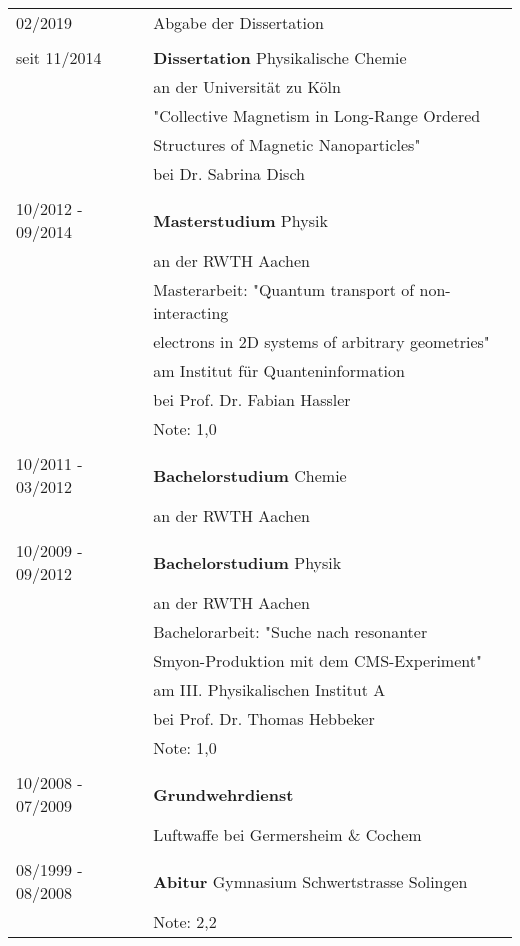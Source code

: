 \documentclass[\main/dresen_thesis.tex]{subfiles}
\begin{document}
	\begin{table}[H]
		\begin{tabular}{p{5cm}l}
			02/2019						& Abgabe der Dissertation\\ \\

			seit 11/2014 			& \textbf{Dissertation} Physikalische Chemie\\
												& an der Universität zu Köln \\
												& "Collective Magnetism in Long-Range Ordered\\
												&  Structures of Magnetic Nanoparticles"\\
												& bei Dr. Sabrina Disch \\ \\

			10/2012 - 09/2014 & \textbf{Masterstudium} Physik \\
												& an der RWTH Aachen \\
												& Masterarbeit: "Quantum transport of non-interacting\\
												& electrons in 2D systems of arbitrary geometries" \\
												& am Institut f\"ur Quanteninformation\\
												& bei Prof. Dr. Fabian Hassler\\
												& Note: 1,0\\ \\

			10/2011 - 03/2012 & \textbf{Bachelorstudium} Chemie \\
			& an der RWTH Aachen  \\ \\

			10/2009 - 09/2012 & \textbf{Bachelorstudium} Physik \\
											  & an der RWTH Aachen  \\
												& Bachelorarbeit: "Suche nach resonanter \\
												& Smyon-Produktion mit dem CMS-Experiment"\\
												& am III. Physikalischen Institut A\\
												& bei Prof. Dr. Thomas Hebbeker\\
												& Note: 1,0\\ \\

			10/2008 - 07/2009 & \textbf{Grundwehrdienst} \\
												& Luftwaffe bei Germersheim \& Cochem \\ \\

			08/1999 - 08/2008 & \textbf{Abitur} Gymnasium Schwertstrasse Solingen \\
												& Note: 2,2\\
			\end{tabular}
	\end{table}
\end{document}
